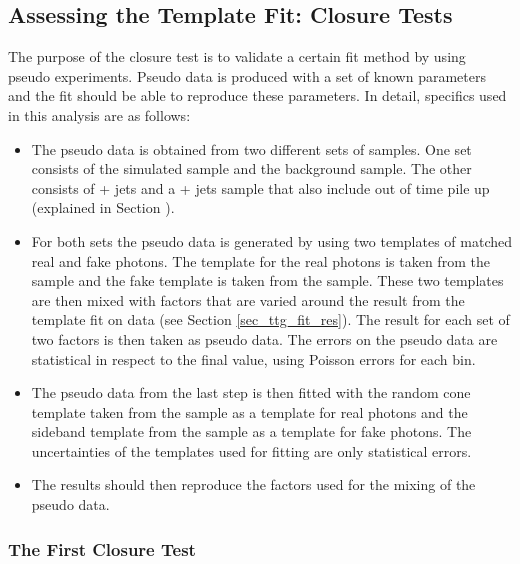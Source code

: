 \subsection{Assessing the Template Fit: Closure Tests}
\label{sec_ttg_clo}

The purpose of the closure test is to validate a certain fit method by using pseudo experiments. Pseudo data is produced with a set of known parameters and the fit should be able to reproduce these parameters. In detail, specifics used in this analysis are as follows:

\begin{itemize}
\item The pseudo data is obtained from two different sets of samples. One set consists of the simulated \ttgamma sample and the \ttbar background sample. The other consists of \ttgamma + jets and a \ttbar + jets sample that also include out of time pile up (explained in Section ).
\item For both sets the pseudo data is generated by using two templates of matched real and fake photons. The template for the real photons is taken from the \ttgamma sample and the fake template is taken from the \ttbar sample. These two templates are then mixed with factors that are varied around the result from the template fit on data (see Section \ref{sec_ttg_fit_res}). The result for each set of two factors is then taken as pseudo data. The errors on the pseudo data are statistical in respect to the final value, using Poisson errors for each bin.
\item The pseudo data from the last step is then fitted with the random cone template taken from the \ttgamma sample as a template for real photons and the sideband template from the \ttbar sample as a template for fake photons. The uncertainties of the templates used for fitting are only statistical errors.
\item The results should then reproduce the factors used for the mixing of the pseudo data. 
\end{itemize}

\subsubsection{The First Closure Test}
\label{sec_ttg_clo_norm}

